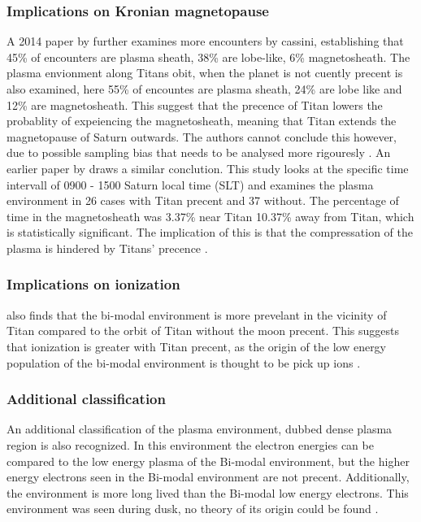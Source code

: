\documentclass[12pt, parskip=full*, abstract]{scrartcl}
\begin{document}
\subsubsection{Implications on Kronian magnetopause}
A 2014 paper by \textcite{Smith-WithOrWithoutTitan} further examines more encounters by cassini, establishing that 45\% of encounters are plasma sheath, 38\% are lobe-like, 6\% magnetosheath. The plasma envionment along Titans obit, when the planet is not cuently precent is also examined, here 55\% of encountes are plasma sheath, 24\% are lobe like and 12\% are magnetosheath. This suggest that the precence of Titan lowers the probablity of expeiencing the magnetosheath, meaning that Titan extends the magnetopause of Saturn outwards.
The authors cannot conclude this however, due to possible sampling bias that needs to be analysed more rigouresly \parencite{Smith-WithOrWithoutTitan}. An earlier paper by \textcite{Wei-WithOrWithoutTitan} draws a similar conclution. This study looks at the specific time intervall of 0900 - 1500 Saturn local time (SLT) and examines the plasma environment in 26 cases with Titan precent and 37 without. The percentage of time in the magnetosheath was 3.37\% near Titan 10.37\% away from Titan, which is statistically significant. The implication of this is that the compressation of the plasma is hindered by Titans' precence \parencite{Wei-WithOrWithoutTitan}.  

\subsubsection{Implications on ionization}
\textcite{Smith-WithOrWithoutTitan} also finds that the bi-modal environment is more prevelant in the vicinity of Titan compared to the orbit of Titan without the moon precent. This suggests that ionization is greater with Titan precent, as the origin of the low energy population of the bi-modal environment is thought to be pick up ions \parencite{Smith-WithOrWithoutTitan}. 

\subsubsection{Additional classification}%
An additional classification of the plasma environment, dubbed dense plasma region is also recognized. In this environment the electron energies can be compared to the low energy plasma of the Bi-modal environment, but the higher energy electrons seen in the Bi-modal environment are not precent. Additionally, the environment is more long lived than the Bi-modal low energy electrons. This environment was seen during dusk, no theory of its origin could be found \parencite{Smith-WithOrWithoutTitan}.
\end{document}

